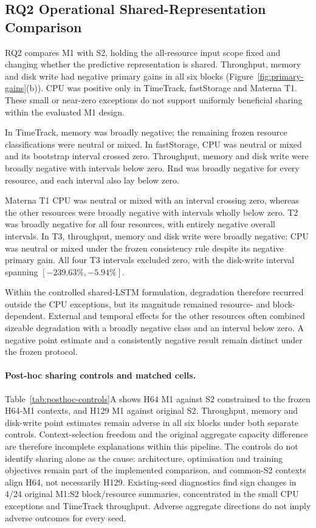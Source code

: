\documentclass[a4paper,fleqn]{cas-dc}
\begin{document}
\subsection{RQ2 Operational Shared-Representation Comparison}
\label{sec:results-rq2}

RQ2 compares M1 with S2, holding the all-resource input scope fixed and changing
whether the predictive representation is shared. Throughput, memory and disk
write had negative primary gains in all six blocks
(Figure~\ref{fig:primary-gains}(b)). CPU was positive only in TimeTrack,
fastStorage and Materna T1. These small or near-zero exceptions do not support
uniformly beneficial sharing within the evaluated M1 design.

In TimeTrack, memory was broadly negative; the remaining frozen resource
classifications were neutral or mixed. In fastStorage, CPU was neutral or
mixed and its bootstrap interval crossed zero. Throughput, memory and disk
write were broadly negative with intervals below zero. Rnd was broadly
negative for every resource, and each interval also lay below zero.

Materna T1 CPU was neutral or mixed with an interval crossing zero, whereas
the other resources were broadly negative with intervals wholly below zero.
T2 was broadly negative for all four resources, with entirely negative
overall intervals. In T3, throughput, memory and disk write were broadly
negative; CPU was neutral or mixed under the frozen consistency rule despite
its negative primary gain. All four T3 intervals excluded zero, with the
disk-write interval spanning $[-239.63\%,-5.94\%]$.

Within the controlled shared-LSTM formulation, degradation therefore recurred
outside the CPU exceptions, but its magnitude remained resource- and
block-dependent. External and temporal effects for the other resources often
combined sizeable degradation with a broadly negative class and an interval
below zero. A negative point estimate and a consistently negative result
remain distinct under the frozen protocol.

\paragraph{Post-hoc sharing controls and matched cells.}
Table~\ref{tab:posthoc-controls}A shows H64 M1 against S2 constrained to the
frozen H64-M1 contexts, and H129 M1 against original S2. Throughput, memory
and disk-write point estimates remain adverse in all six blocks under both
separate controls. Context-selection freedom and the original aggregate
capacity difference are therefore incomplete explanations within this
pipeline. The controls do not identify sharing alone as the cause:
architecture, optimisation and training objectives remain part of the
implemented comparison, and common-S2 contexts align H64, not necessarily
H129. Existing-seed diagnostics find sign changes in 4/24 original M1:S2
block/resource summaries, concentrated in the small CPU exceptions and
TimeTrack throughput. Adverse aggregate directions do not imply adverse
outcomes for every seed.
\end{document}

